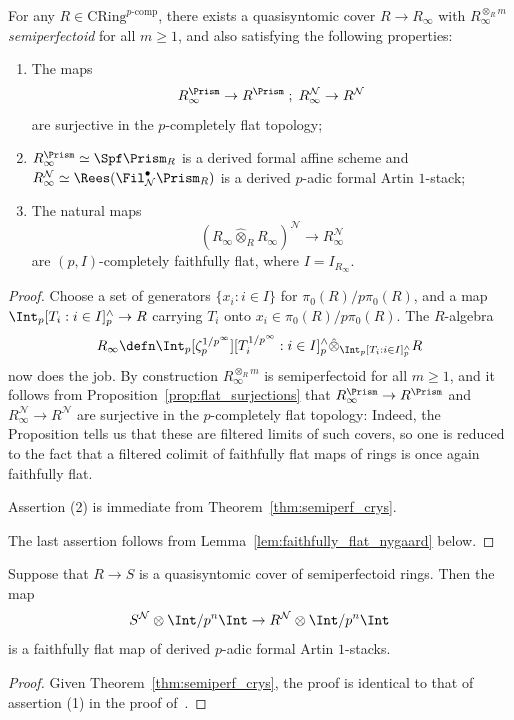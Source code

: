 \documentclass[10pt]{amsart}
\begin{document}
\begin{corollary}
\label{cor:semiperf_qsynt}
For any $R\in \mathrm{CRing}^{p\text{-comp}}$, there exists a quasisyntomic cover $R\to R_\infty$ with $R_\infty^{\otimes_R m}$ \emph{semiperfectoid} for all $m\ge 1$, and also satisfying the following properties:
\begin{enumerate}
   \item The maps 
\[
R_\infty^{\Prism}\to R^{\Prism}\;;\; R_{\infty}^{\mathcal{N}}\to R^{\mathcal{N}}
\]
are surjective in the $p$-completely flat topology;
   \item $R_{\infty}^{\Prism}\simeq \Spf\Prism_R$ is a derived formal affine scheme and $R_{\infty}^{\mathcal{N}}\simeq \Rees(\Fil^\bullet_{\mathcal{N}}\Prism_R)$ is a derived $p$-adic formal Artin $1$-stack; 
   \item The natural maps
   \[
    (R_{\infty}\hat{\otimes}_RR_{\infty})^{\mathcal{N}} \to R_{\infty}^{\mathcal{N}}
   \]
   are $(p,I)$-completely faithfully flat, where $I = I_{R_{\infty}}$.
\end{enumerate}
\end{corollary}
\begin{proof}
Choose a set of generators $\{x_i:i\in I\}$ for $\pi_0(R)/p\pi_0(R)$, and a map $\Int_p[T_i:i\in I]^{\wedge}_p\to R$ carrying $T_i$ onto $x_i\in \pi_0(R)/p\pi_0(R)$. The $R$-algebra
\[
R_\infty \defn \Int_p[\zeta_p^{1/p^\infty}][T_i^{1/p^\infty}:i\in I]^{\wedge}_p\hat{\otimes}_{\Int_p[T_i:i\in I]^{\wedge}_p}R
\]
now does the job. By construction $R_\infty^{\otimes_R m}$ is semiperfectoid for all $m\ge 1$, and it follows from Proposition~\ref{prop:flat_surjections} that $R_\infty^\Prism\to R^\Prism$ and $R_\infty^\mathcal{N}\to R^\mathcal{N}$ are surjective in the $p$-completely flat topology: Indeed, the Proposition tells us that these are filtered limits of such covers, so one is reduced to the fact that a filtered colimit of faithfully flat maps of rings is once again faithfully flat.

Assertion (2) is immediate from Theorem~\ref{thm:semiperf_crys}.

The last assertion follows from Lemma~\ref{lem:faithfully_flat_nygaard} below.
\end{proof}


\begin{lemma}
\label{lem:faithfully_flat_nygaard}
Suppose that $R\to S$ is a quasisyntomic cover of semiperfectoid rings. Then the map
\[
S^{\mathcal{N}}\otimes\Int/p^n\Int\to R^{\mathcal{N}}\otimes\Int/p^n\Int
\]
is a faithfully flat map of derived $p$-adic formal Artin $1$-stacks.
\end{lemma}
\begin{proof}
Given Theorem~\ref{thm:semiperf_crys}, the proof is identical to that of assertion (1) in the proof of~\cite[Proposition 2.29]{guo2023frobenius}.
\end{proof}
\end{document}
